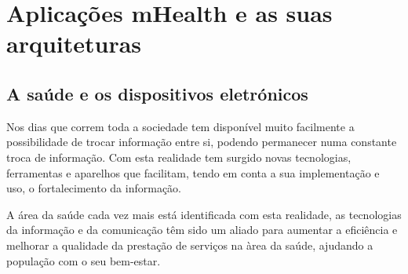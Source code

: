 \chapter{Aplica\c c\~oes mHealth e as suas arquiteturas}

\section{A sa\'ude e os dispositivos eletr\'onicos}

Nos dias que correm toda a sociedade tem dispon\'ivel muito facilmente a possibilidade de trocar informa\c c\~ao entre si, podendo permanecer numa constante troca de informa\c c\~ao.  Com esta realidade tem surgido novas tecnologias, ferramentas e aparelhos que facilitam, tendo em conta a sua implementa\c c\~ao e uso, o fortalecimento da informa\c c\~ao. 
\par
A \'area da sa\'ude cada vez mais est\'a identificada com esta realidade, as tecnologias da informa\c c\~ao e da comunica\c c\~ao t\^em sido um aliado para aumentar a efici\^encia e melhorar a qualidade da presta\c c\~ao de servi\c cos na \`area da sa\'ude, ajudando a popula\c c\~ao com o seu bem-estar. 



